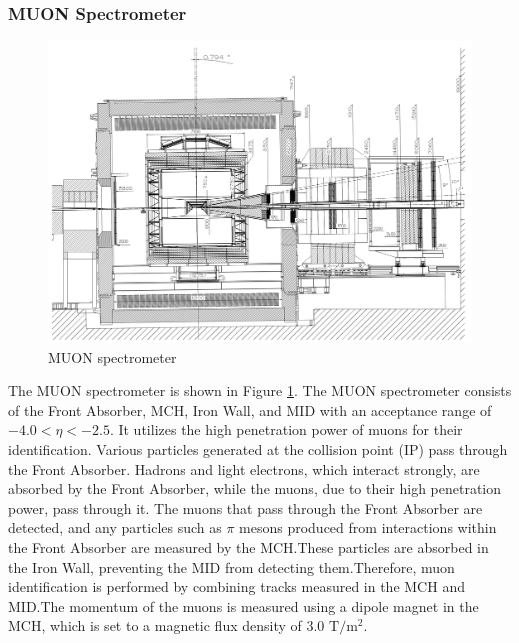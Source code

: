         \subsubsection{MUON Spectrometer}
            \begin{figure}
                \centering
                \includegraphics[keepaspectratio, scale=0.25]{fig/2_2_MUONspectrometer.png}
                \caption{MUON spectrometer}
                \label{MUONspectrometer}
            \end{figure}
            The MUON spectrometer is shown in Figure \ref{MUONspectrometer}\cite{Muon_TDR}. The MUON spectrometer consists of the Front Absorber, MCH, Iron Wall, and MID with an acceptance range of $-4.0 < \eta < -2.5$. It utilizes the high penetration power of muons for their identification. Various particles generated at the collision point (IP) pass through the Front Absorber. Hadrons and light electrons, which interact strongly, are absorbed by the Front Absorber, while the muons, due to their high penetration power, pass through it. The muons that pass through the Front Absorber are detected, and any particles such as $\pi$ mesons produced from interactions within the Front Absorber are measured by the MCH.\@ These particles are absorbed in the Iron Wall, preventing the MID from detecting them.\@ Therefore, muon identification is performed by combining tracks measured in the MCH and MID.\@ The momentum of the muons is measured using a dipole magnet in the MCH, which is set to a magnetic flux density of 3.0 $\mathrm{T/m^2}$.\@
